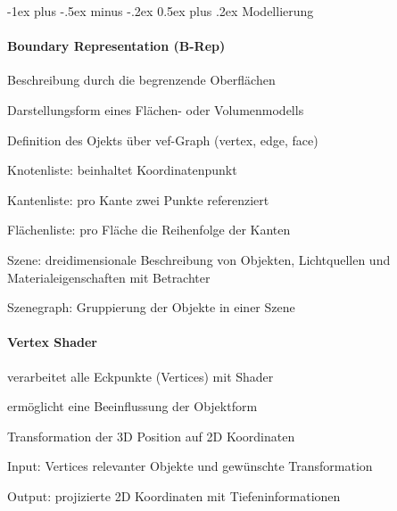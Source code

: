 \documentclass[landscape]{article}
\makeatletter
\renewcommand{\section}{\@startsection{section}{1}{0mm}%
                                {-1ex plus -.5ex minus -.2ex}%
                                {0.5ex plus .2ex}%
                                {\normalfont\large\bfseries}}
\makeatother
\begin{document}
\begin{multicols}{3}
  \section{Modellierung}
  
  \paragraph{Boundary Representation (B-Rep)}
  \begin{itemize*}
    \item Beschreibung durch die begrenzende Oberflächen
    \item Darstellungsform eines Flächen- oder Volumenmodells
    \item Definition des Ojekts über vef-Graph (vertex, edge, face)
    \begin{itemize*}
      \item Knotenliste: beinhaltet Koordinatenpunkt
      \item Kantenliste: pro Kante zwei Punkte referenziert
      \item Flächenliste: pro Fläche die Reihenfolge der Kanten
    \end{itemize*}
    \item Szene: dreidimensionale Beschreibung von Objekten, Lichtquellen und Materialeigenschaften mit Betrachter
    \item Szenegraph: Gruppierung der Objekte in einer Szene
  \end{itemize*}
  
  \paragraph{Vertex Shader}
  \begin{itemize*}
    \item verarbeitet alle Eckpunkte (Vertices) mit Shader
    \item ermöglicht eine Beeinflussung der Objektform
    \item Transformation der 3D Position auf 2D Koordinaten
    \item Input: Vertices relevanter Objekte und gewünschte Transformation
    \item Output: projizierte 2D Koordinaten mit Tiefeninformationen
  \end{itemize*}
  

\end{multicols}
\end{document}
